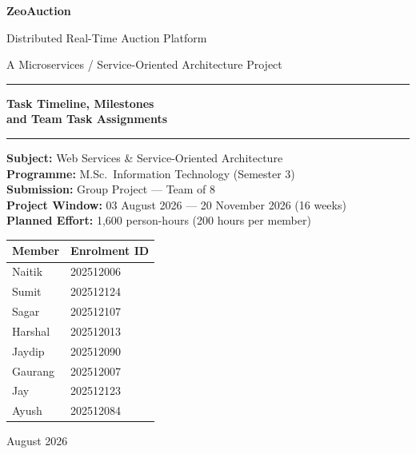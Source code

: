 \documentclass[10pt,a4paper]{article}
\begin{document}
\begin{titlepage}
\centering
\vspace*{2.2cm}

{\Huge\bfseries\color{accent} ZeoAuction\par}
\vspace{0.5cm}
{\Large Distributed Real-Time Auction Platform\par}
\vspace{0.35cm}
{\large A Microservices / Service-Oriented Architecture Project\par}

\vspace{1.5cm}
\rule{0.75\textwidth}{1pt}\par
\vspace{0.6cm}
{\LARGE\bfseries Task Timeline, Milestones\\[0.25cm] and Team Task Assignments\par}
\vspace{0.6cm}
\rule{0.75\textwidth}{1pt}\par

\vspace{1.5cm}
{\large\bfseries Subject:} Web Services \& Service-Oriented Architecture\\[0.28cm]
{\large\bfseries Programme:} M.Sc.\ Information Technology (Semester 3)\\[0.28cm]
{\large\bfseries Submission:} Group Project --- Team of 8\\[0.28cm]
{\large\bfseries Project Window:} 03 August 2026 --- 20 November 2026 (16 weeks)\\[0.28cm]
{\large\bfseries Planned Effort:} 1{,}600 person-hours (200 hours per member)

\vspace{1.6cm}
\begin{tabular}{ll}
\toprule
\textbf{Member} & \textbf{Enrolment ID} \\
\midrule
Naitik   & 202512006 \\
Sumit    & 202512124 \\
Sagar    & 202512107 \\
Harshal  & 202512013 \\
Jaydip   & 202512090 \\
Gaurang  & 202512007 \\
Jay      & 202512123 \\
Ayush    & 202512084 \\
\bottomrule
\end{tabular}

\vfill
{\large August 2026}
\end{titlepage}
\end{document}
